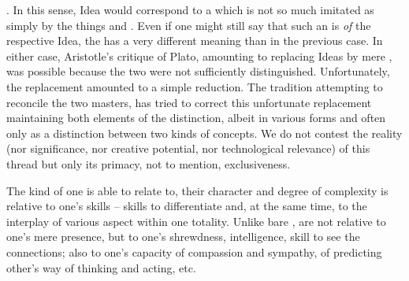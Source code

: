 . In this sense, Idea would correspond to a 
which is not so much imitated as simply  by the things and
. Even if one might still say that such an  is
{\em of} the respective Idea, the  has a very different meaning than in
the previous case. In either case, Aristotle's critique of Plato, amounting to
replacing Ideas by mere , was possible because the two were not
sufficiently distinguished.  Unfortunately, the replacement amounted to a simple
reduction. The tradition attempting to reconcile the two masters, has
tried to correct this unfortunate replacement maintaining both elements of the
distinction, albeit in various forms and often only as a distinction between two
kinds of concepts.  We do not contest the reality (nor
significance, nor creative potential, nor technological relevance) of this
 thread but only its primacy, not to mention, exclusiveness.




\pa The kind of  one is able to relate to, their character and
degree of complexity is relative to one's skills -- skills to differentiate and,
at the same time, to  the interplay of various aspect within one
totality.  Unlike bare ,  are not relative to one's
mere presence, but to one's shrewdness, intelligence, skill to see the
connections; also to one's capacity of compassion and sympathy, of predicting
other's way of thinking and acting, etc.

